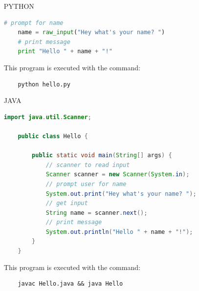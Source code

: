 \documentclass[12pt]{report}
\begin{document}
\begin{enumerate}
  \item [PYTHON]
  \begin{lstlisting}[language = Python]
    # prompt for name
    name = raw_input("Hey what's your name? ")
    # print message
    print "Hello " + name + "!"
  \end{lstlisting}

  This program is executed with the command:
  \begin{verbatim}
    python hello.py
  \end{verbatim}
  \vspace{1.5cm}

  \item [JAVA]
  \begin{lstlisting}[language = Java]
    import java.util.Scanner;

    public class Hello {

        public static void main(String[] args) {
            // scanner to read input
            Scanner scanner = new Scanner(System.in);
            // prompt user for name
            System.out.print("Hey what's your name? ");
            // get input
            String name = scanner.next();
            // print message
            System.out.println("Hello " + name + "!");
        }
    }
  \end{lstlisting}

  This program is executed with the command:
  \begin{verbatim}
    javac Hello.java && java Hello
  \end{verbatim}
\end{enumerate}
\end{document}
